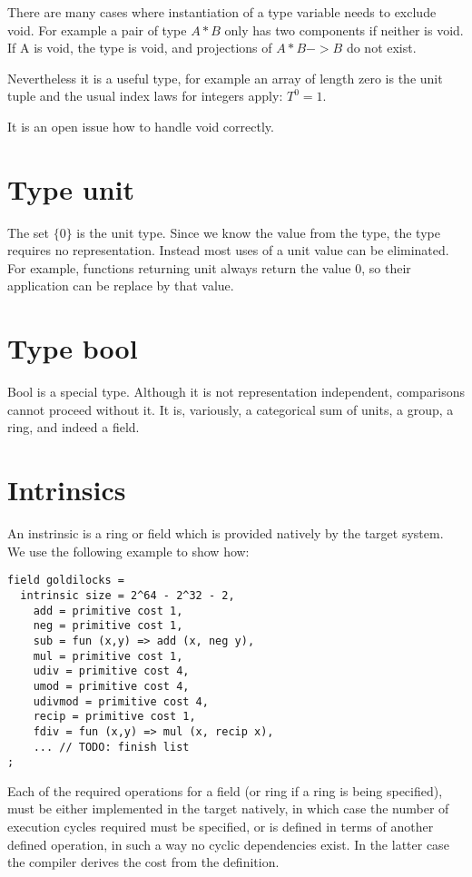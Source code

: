 \documentclass[oneside]{book}
\theoremstyle{plain}
\theoremstyle{definition}
\theoremstyle{plain}
\begin{document}
There are many cases where instantiation of a type variable needs to exclude void.
For example a pair of type $A * B$ only has two components if neither is void.
If A is void, the type is void, and projections of $A * B -> B$ do not exist.

Nevertheless it is a useful type, for example an array of length zero is the
unit tuple and the usual index laws for integers apply: $T^0 = 1$.

It is an open issue how to handle void correctly.

\section{Type unit}
The set $\{0\}$ is the unit type. Since we know the value from the type,
the type requires no representation. Instead most uses of a unit value
can be eliminated. For example, functions returning unit always return
the value 0, so their application can be replace by that value.

\section{Type bool}
Bool is a special type. Although it is not representation independent,
comparisons cannot proceed without it. It is, variously, a categorical
sum of units, a group, a ring, and indeed a field.



\section{Intrinsics}
An instrinsic is a ring or field which is provided natively by the target system.
We use the following example to show how:
\begin{verbatim}
field goldilocks = 
  intrinsic size = 2^64 - 2^32 - 2, 
    add = primitive cost 1,
    neg = primitive cost 1,
    sub = fun (x,y) => add (x, neg y),
    mul = primitive cost 1,
    udiv = primitive cost 4,
    umod = primitive cost 4,
    udivmod = primitive cost 4,
    recip = primitive cost 1,
    fdiv = fun (x,y) => mul (x, recip x),
    ... // TODO: finish list
;
\end{verbatim}
Each of the required operations for a field (or ring if a ring is being specified),
must be either implemented in the target natively, in which case the number of
execution cycles required must be specified, or is defined in terms of another
defined operation, in such a way no cyclic dependencies exist. In the latter case
the compiler derives the cost from the definition.
\end{document}

